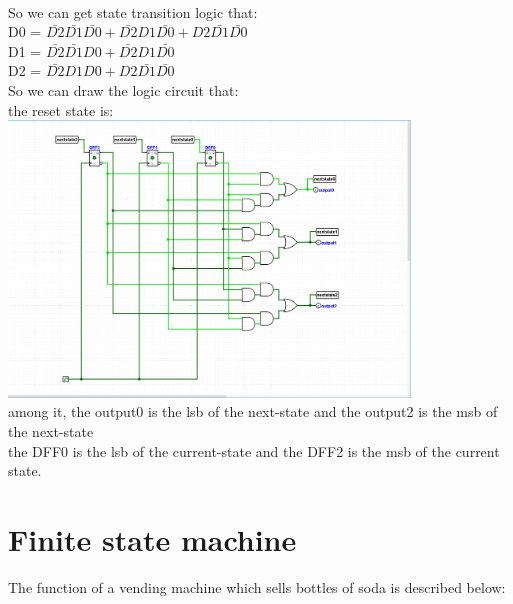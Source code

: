 \documentclass[a4paper]{article}
\begin{document}
\begin{answer}[Question 2]
    \\
    So we can get state transition logic that:\\
    D0 = $\bar{D2}\bar{D1}\bar{D0} + \bar{D2}D1\bar{D0} + D2\bar{D1}\bar{D0}$\\
    D1 = $\bar{D2}\bar{D1}D0 + \bar{D2}D1\bar{D0}$\\
    D2 = $\bar{D2}D1D0 + D2\bar{D1}\bar{D0}$\\
    So we can draw the logic circuit that:\\
    the reset state is:\\
    \includegraphics[width=0.8\textwidth]{hw4_q2_logic_circuit.png}\\
    among it, the output0 is the lsb of the next-state and the output2 is the msb of the next-state\\
    the DFF0 is the lsb of the current-state and the DFF2 is the msb of the current state.\\
\end{answer}

\newpage
\section{Finite state machine}

The function of a vending machine which sells bottles of soda is described below:
\end{document}
